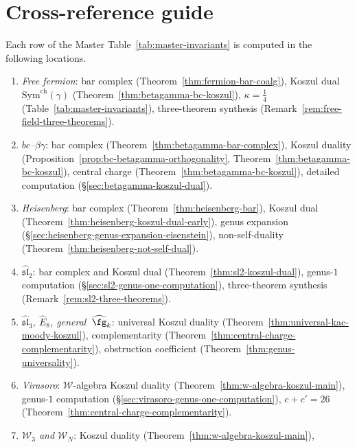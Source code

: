 \section*{Cross-reference guide}
\label{sec:cross-ref-guide}

\begin{remark}\label{rem:cross-ref-guide}
Each row of the Master Table~\textup{\ref{tab:master-invariants}} is
computed in the following locations.
\begin{enumerate}
\item \emph{Free fermion}:
 bar complex (Theorem~\ref{thm:fermion-bar-coalg}),
 Koszul dual $\mathrm{Sym}^{\mathrm{ch}}(\gamma)$
 (Theorem~\ref{thm:betagamma-bc-koszul}),
 $\kappa = \tfrac{1}{4}$ (Table~\ref{tab:master-invariants}),
 three-theorem synthesis
 (Remark~\ref{rem:free-field-three-theorems}).
\item \emph{$bc$--$\beta\gamma$}:
 bar complex (Theorem~\ref{thm:betagamma-bar-complex}),
 Koszul duality
 (Proposition~\ref{prop:bc-betagamma-orthogonality},
 Theorem~\ref{thm:betagamma-bc-koszul}),
 central charge (Theorem~\ref{thm:betagamma-bc-koszul}),
 detailed computation (\S\ref{sec:betagamma-koszul-dual}).
\item \emph{Heisenberg}:
 bar complex (Theorem~\ref{thm:heisenberg-bar}),
 Koszul dual (Theorem~\ref{thm:heisenberg-koszul-dual-early}),
 genus expansion
 (\S\ref{sec:heisenberg-genus-expansion-eisenstein}),
 non-self-duality (Theorem~\ref{thm:heisenberg-not-self-dual}).
\item \emph{$\widehat{\mathfrak{sl}}_2$}:
 bar complex and Koszul dual
 (Theorem~\ref{thm:sl2-koszul-dual}),
	 genus-$1$ computation (\S\ref{sec:sl2-genus-one-computation}),
 three-theorem synthesis (Remark~\ref{rem:sl2-three-theorems}).
\item \emph{$\widehat{\mathfrak{sl}}_3$, $\widehat{E}_8$,
 general~$\widehat{\fg}_k$}:
 universal Koszul duality
 (Theorem~\ref{thm:universal-kac-moody-koszul}),
 complementarity
 (Theorem~\ref{thm:central-charge-complementarity}),
 obstruction coefficient
 (Theorem~\ref{thm:genus-universality}).
\item \emph{Virasoro}:
 $\mathcal{W}$-algebra Koszul duality
 (Theorem~\ref{thm:w-algebra-koszul-main}),
	 genus-$1$ computation (\S\ref{sec:virasoro-genus-one-computation}),
 $c + c' = 26$
 (Theorem~\ref{thm:central-charge-complementarity}).
\item \emph{$\mathcal{W}_3$ and $\mathcal{W}_N$}:
 Koszul duality (Theorem~\ref{thm:w-algebra-koszul-main}),

\end{enumerate}
\end{remark}
